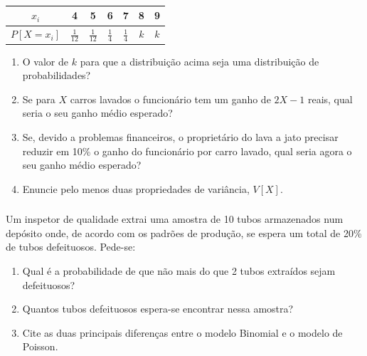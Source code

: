 \documentclass[14pt,aspectratio=1610]{beamer}
\begin{document}
\begin{frame}{}
\frametitle{}
\begin{block}{}
\justifying
\begin{table}[!ht]
\centering
\renewcommand{\arraystretch}{1.8}
\begin{tabular}{c|cccccc}
\hline
		$x_i$ & 4 & 5 & 6 & 7 & 8 & 9 \\
\hline
		 $P\left[X=x_i\right]$ & $\frac{1}{12}$ & $\frac{1}{12}$ & $\frac{1}{4}$ & $\frac{1}{4}$ & $k$ & $k$ \\
\hline
\end{tabular}
\end{table}

\begin{enumerate}
\item O valor de $k$ para que a distribuição acima seja uma distribuição de probabilidades?
\item Se para $X$ carros lavados o funcionário tem um ganho de $2X-1$ reais, qual seria o seu ganho médio esperado?
\item Se, devido a problemas financeiros, o proprietário do lava a jato precisar reduzir em 10\% o ganho do funcionário por carro lavado, qual seria agora o seu ganho médio esperado?
\item  Enuncie pelo menos duas propriedades de variância, $V\left[X\right]$.
\end{enumerate}
\end{block}
\end{frame}

\begin{frame}{}
\frametitle{}
\begin{block}{}
\justifying
Um inspetor de qualidade extrai uma amostra de 10 tubos armazenados num depósito onde, de acordo com os padrões de produção, se espera um total de 20\% de tubos defeituosos. Pede-se:
\begin{enumerate}
\item Qual é a probabilidade de que não mais do que 2 tubos extraídos sejam defeituosos?
\item Quantos tubos defeituosos espera-se encontrar nessa amostra?
\item Cite as duas principais diferenças entre o modelo Binomial e o modelo de Poisson.
\end{enumerate}
\end{block}
\end{frame}
\end{document}
